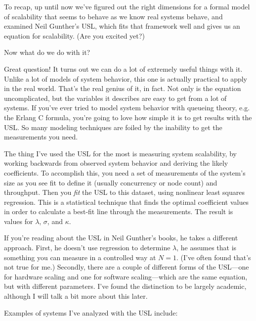 \documentclass{vivid_layout}
\begin{document}
To recap, up until now we've figured out the right dimensions for a formal model
of scalability that seems to behave as we know real systems behave, and examined
Neil Gunther's USL, which fits that framework well and gives us an equation for
scalability. (Are you excited yet?)

Now what do we do with it?

Great question! It turns out we can do a lot of extremely useful things with it.
Unlike a lot of models of system behavior, this one is actually practical to
apply in the real world. That's the real genius of it, in fact. Not only is the
equation uncomplicated, but the variables it describes are easy to get from a
lot of systems.  If you've ever tried to model system behavior with queueing
theory, e.g. the Erlang C formula, you're going to love how simple it is to get
results with the USL. So many modeling techniques are foiled by the inability to
get the measurements you need.

The thing I've used the USL for the most is measuring system scalability, by
working backwards from observed system behavior and deriving the likely
coefficients. To accomplish this, you need a set of measurements of the system's
size as you see fit to define it (usually concurrency or node count) and
throughput. Then you {\itshape fit} the USL to this dataset, using nonlinear
least squares regression. This is a statistical technique that finds the optimal
coefficient values in order to calculate a best-fit line through the
measurements. The result is values for $\lambda$, $\sigma$, and $\kappa$.

If you're reading about the USL in Neil Gunther's books, he takes a different
approach. First, he doesn't use regression to determine $\lambda$, he assumes
that is something you can measure in a controlled way at $N=1$. (I've often
found that's not true for me.) Secondly, there are a couple of different forms
of the USL---one for hardware scaling and one for software scaling---which are
the same equation, but with different parameters. I've found the distinction to
be largely academic, although I will talk a bit more about this later.

Examples of systems I've analyzed with the USL include:
\end{document}
